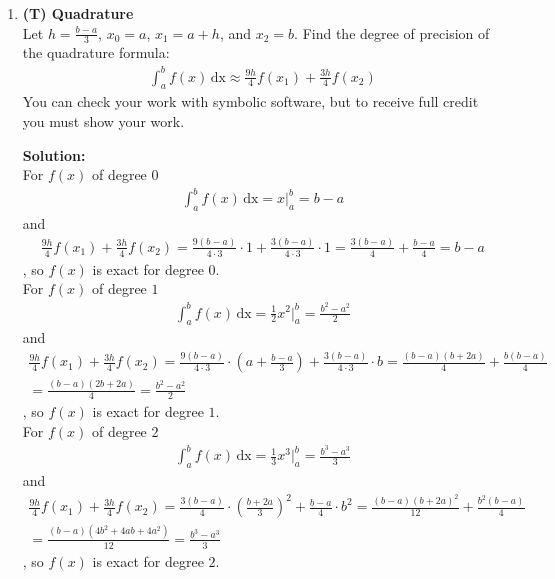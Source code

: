 \documentclass[12pt]{article}
\begin{document}
\begin{enumerate}[label=\bfseries Problem \arabic*:]






 
\item \textbf{(T) Quadrature}\\
Let $h=\frac{b-a}{3}$, $x_0=a$, $x_1=a+h$, and $x_2=b$. Find the degree of precision of the quadrature formula:
\begin{align*}
\int_a^b f(x) \, \text{dx}\approx \frac{9h}{4} f(x_1)+\frac{3h}{4} f(x_2)
\end{align*}
You can check your work with symbolic software, but to receive full credit you must show your work.



\vspace{1em}
\textbf{Solution:}\\
For $f(x)$ of degree $0$
\begin{align*}
    \int_a^b f(x) \, \text{dx}=x|_{a}^{b}=b-a
\end{align*}
and
\begin{align*}
    \frac{9h}{4} f(x_1)+\frac{3h}{4} f(x_2)=\frac{9(b-a)}{4\cdot 3}\cdot1+\frac{3(b-a)}{4\cdot 3}\cdot 1=\frac{3(b-a)}{4}+\frac{b-a}{4}=b-a
\end{align*}
, so $f(x)$ is exact for degree $0$.\\

For $f(x)$ of degree $1$
\begin{align*}
    \int_a^b f(x) \, \text{dx}=\frac{1}{2}x^2|_{a}^{b}=\frac{b^2-a^2}{2}
\end{align*}
and
\begin{multline*}
    \frac{9h}{4} f(x_1)+\frac{3h}{4} f(x_2)=\frac{9(b-a)}{4\cdot 3}\cdot (a+\frac{b-a}{3})+\frac{3(b-a)}{4\cdot 3}\cdot b=\frac{(b-a)(b+2a)}{4}+\frac{b(b-a)}{4}\\
    =\frac{(b-a)(2b+2a)}{4}=\frac{b^2-a^2}{2}
\end{multline*}
, so $f(x)$ is exact for degree $1$.\\

For $f(x)$ of degree $2$
\begin{align*}
    \int_a^b f(x) \, \text{dx}=\frac{1}{3}x^3|_{a}^{b}=\frac{b^3-a^3}{3}
\end{align*}
and
\begin{multline*}
    \frac{9h}{4} f(x_1)+\frac{3h}{4} f(x_2)=\frac{3(b-a)}{4}\cdot (\frac{b+2a}{3})^2+\frac{b-a}{4}\cdot b^2=\frac{(b-a)(b+2a)^2}{12}+\frac{b^2(b-a)}{4}\\
    =\frac{(b-a)(4b^2+4ab+4a^2)}{12}=\frac{b^3-a^3}{3}
\end{multline*}
, so $f(x)$ is exact for degree $2$.\\


\end{enumerate}
\end{document}
